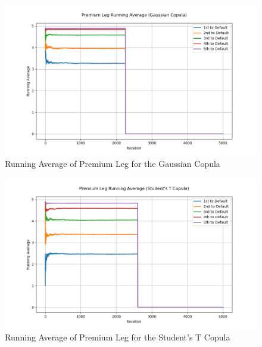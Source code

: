 \documentclass{report}
\theoremstyle{plain}
\theoremstyle{definition}
\begin{document}
\begin{figure}[H]
	\begin{center}
		\includegraphics[width=15cm]{Premium_Leg_Running_Average_(Gaussian_Copula).png}
		\caption{Running Average of Premium Leg for the Gaussian Copula} 
		\label{Premium_Leg_Running_Average_(Gaussian_Copula)}
	\end{center}
\end{figure}

\begin{figure}[H]
	\begin{center}
		\includegraphics[width=15cm]{Premium_Leg_Running_Average_(Student's_T_Copula).png}
		\caption{Running Average of Premium Leg for the Student's T Copula} 
		\label{Premium_Leg_Running_Average_(Student's_T_Copula)}
	\end{center}
\end{figure}
\end{document}
